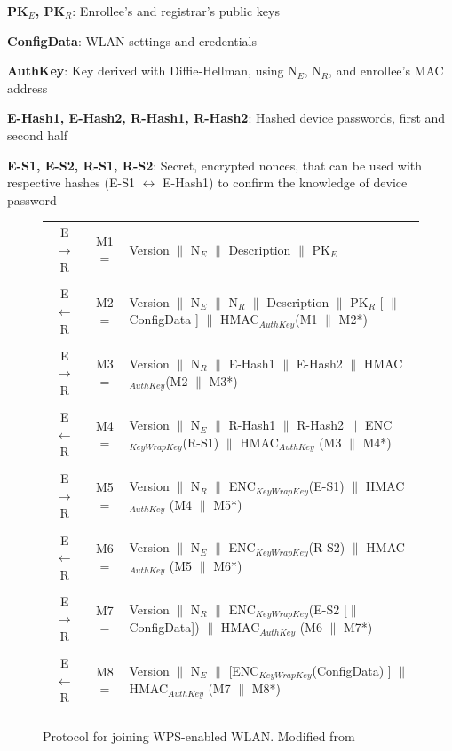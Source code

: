\documentclass[12pt,a4paper,oneside,pdftex]{report}
\begin{document}
\textbf{PK$_E$, PK$_R$}: Enrollee's and registrar's public keys

\textbf{ConfigData}: WLAN settings and credentials

\textbf{AuthKey}: Key derived with Diffie-Hellman, using N$_E$, N$_R$, and enrollee's MAC address

\textbf{E-Hash1, E-Hash2, R-Hash1, R-Hash2}: Hashed device passwords, first and second half

\textbf{E-S1, E-S2, R-S1, R-S2}: Secret, encrypted nonces, that can be used with respective hashes (E-S1 $\leftrightarrow$ E-Hash1) to confirm the knowledge of device password

\begin{figure}
\label{tab:wps_full}
\begin{tabular}{c|c p{10cm}}

E $\rightarrow$ R & M1 = & Version $\|$ N$_E$ $\|$ Description $\|$ PK$_E$ 
\\\\

E $\leftarrow$  R & M2 = & Version $\|$ N$_E$ $\|$ N$_R$ $\|$ Description $\|$ PK$_R$ [ $\|$ ConfigData ] $\|$ HMAC$_{AuthKey}$(M1 $\|$ M2*) 
\\\\

E $\rightarrow$ R & M3 = & Version $\|$ N$_R$ $\|$ E-Hash1 $\|$ E-Hash2 $\|$ HMAC$_{AuthKey}$(M2 $\|$ M3*) 
\\\\

E $\leftarrow$  R & M4 = & Version $\|$ N$_E$ $\|$ R-Hash1 $\|$ R-Hash2 $\|$ ENC$_{KeyWrapKey}$(R-S1) $\|$ HMAC$_{AuthKey}$ (M3 $\|$ M4*) 
\\\\

E $\rightarrow$ R & M5 = & Version $\|$ N$_R$ $\|$ ENC$_{KeyWrapKey}$(E-S1) $\|$ HMAC$_{AuthKey}$ (M4 $\|$ M5*) 
\\\\

E $\leftarrow$  R & M6 = & Version $\|$ N$_E$ $\|$ ENC$_{KeyWrapKey}$(R-S2) $\|$ HMAC$_{AuthKey}$ (M5 $\|$ M6*) 
\\\\

E $\rightarrow$ R & M7 = & Version $\|$ N$_R$ $\|$ ENC$_{KeyWrapKey}$(E-S2 [$\|$ConfigData]) $\|$ HMAC$_{AuthKey}$ (M6 $\|$ M7*) 
\\\\

E $\leftarrow$  R & M8 = & Version $\|$ N$_E$ $\|$ [ENC$_{KeyWrapKey}$(ConfigData) ] $\|$ HMAC$_{AuthKey}$ (M7 $\|$ M8*) 
\\\\

\end{tabular}
\caption{Protocol for joining WPS-enabled WLAN. Modified from~\cite{microsoftWCN}}
\end{figure}
\end{document}
